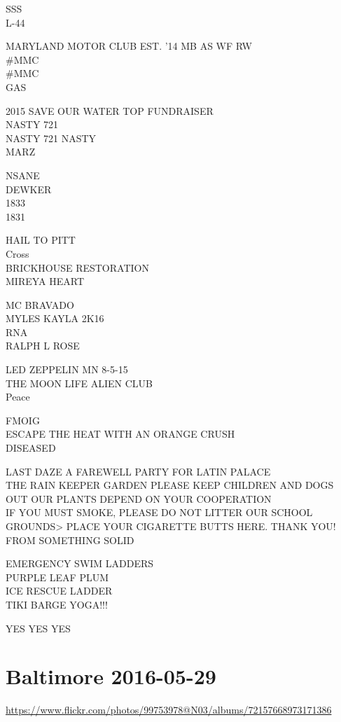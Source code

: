 \documentclass[10pt,letterpaper]{article}
\begin{document}
SSS\\
L{-}44

MARYLAND MOTOR CLUB EST. '14 MB AS WF RW\\
\#MMC\\
\#MMC\\
GAS

2015 SAVE OUR WATER TOP FUNDRAISER\\
NASTY 721\\
NASTY 721 NASTY\\
MARZ

NSANE\\
DEWKER\\
1833\\
1831

HAIL TO PITT\\
Cross\\
BRICKHOUSE RESTORATION\\
MIREYA HEART

MC BRAVADO\\
MYLES KAYLA 2K16\\
RNA\\
RALPH L ROSE

LED ZEPPELIN MN 8{-}5{-}15\\
THE MOON LIFE ALIEN CLUB\\
Peace

FMOIG\\
ESCAPE THE HEAT WITH AN ORANGE CRUSH\\
DISEASED

LAST DAZE A FAREWELL PARTY FOR LATIN PALACE\\
THE RAIN KEEPER GARDEN PLEASE KEEP CHILDREN AND DOGS OUT OUR PLANTS DEPEND ON YOUR COOPERATION\\
IF YOU MUST SMOKE, PLEASE DO NOT LITTER OUR SCHOOL GROUNDS>  PLACE YOUR CIGARETTE BUTTS HERE.  THANK YOU!\\
FROM SOMETHING SOLID

EMERGENCY SWIM LADDERS\\
PURPLE LEAF PLUM\\
ICE RESCUE LADDER\\
TIKI BARGE YOGA!!!

YES YES YES
\pagebreak

\section*{Baltimore 2016-05-29}

\url{https://www.flickr.com/photos/99753978@N03/albums/72157668973171386}
\end{document}

